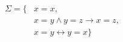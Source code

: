 \documentclass[preview]{standalone}
\begin{document}
\begin{align*}
\Sigma = \{ &x=x, \\ &x=y \land y=z \to x=z, \\ &x=y \leftrightarrow y=x \}
\end{align*}
\end{document}
